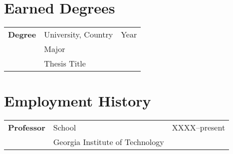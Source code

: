 \section{Earned Degrees}
\label{sec:educational}

\begin{tabular}{p{}p{}r}
\textbf{Degree} & University, Country & {Year}\\
                & Major& \\
                & Thesis Title&\\
\end{tabular}


\section{Employment History}
\label{sec:employment}

\begin{tabular}{p{}p{}r}
    \textbf{Professor}  & School & {XXXX--present}\\
                        & Georgia Institute of Technology & \\
\end{tabular}


